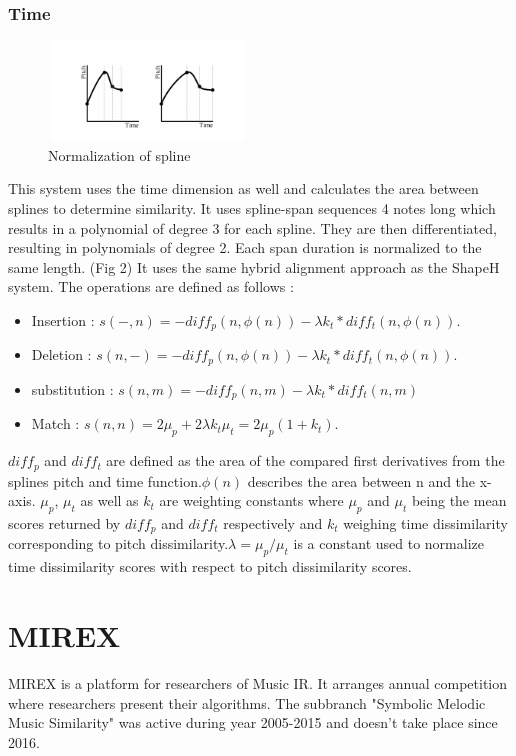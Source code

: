 \documentclass{llncs}
\begin{document}
\begin{itemize}
		\subsubsection{Time}
        \begin{figure}[h!]
			\centering
		  \includegraphics[width=200px,height=100px,keepaspectratio]{two_of_five_point_one}
			\caption{Normalization of spline \cite{five_point_two}}
        \end{figure}
        This system uses the time dimension as well and calculates the area between splines to determine similarity. It uses spline-span sequences 4 notes long which results in a polynomial of degree 3 for each spline. They are then differentiated, resulting in polynomials of degree 2. Each span duration is normalized to the same length. (Fig 2)
        It uses the same hybrid alignment approach as the ShapeH system. 
		The operations are defined as follows : 
        \begin{itemize}
         \item Insertion : 
        $ s(-,n) = -diff _p(n, \phi(n)) - \lambda k_t * diff_t(n, \phi(n)).$
        \item Deletion : 
         $s(n,-) = -diff_p(n, \phi(n)) - \lambda k_t * diff_t (n, \phi(n)).$
       \item substitution : 
       $s(n,m) = - diff_p (n,m) - \lambda k_t * diff_t (n,m) $
       \item Match : 
        $s(n,n) = 2\mu_p + 2\lambda k_t \mu_t = 2\mu_p (1+k_t).$
        \end{itemize}
        
        $diff_p$ and $diff_t$ are defined as the area of the compared first derivatives from the splines pitch and time function.$ \phi(n)$ describes the area between n and the x-axis. $\mu_p$, $\mu_t$ as well as $k_t$ are weighting constants where $\mu_p$ and $\mu_t$ being the mean scores returned by $diff_p$ and $diff_t$ respectively and $k_t$ weighing time dissimilarity corresponding to pitch dissimilarity.$ \lambda = \mu_p / \mu_t$ is a constant used to normalize time dissimilarity scores with respect to pitch dissimilarity scores.
        
	\section{MIREX}
		MIREX is a platform for researchers of Music IR. It arranges annual competition where researchers present their algorithms. The subbranch "Symbolic Melodic Music Similarity" was active during year 2005-2015 and doesn't take place since 2016. 


\end{itemize}
\end{document}
